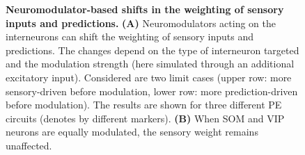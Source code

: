 \documentclass[10pt,a4paper,draft]{article}
\begin{document}
\begin{figure}[t!]
	\centering
\caption{\footnotesize{\bf Neuromodulator-based shifts in the weighting of sensory inputs and predictions.
\newline} 
{\bf (A)} Neuromodulators acting on the interneurons can shift the weighting of sensory inputs and predictions. The changes depend on the type of interneuron targeted and the modulation strength (here simulated through an additional excitatory input). Considered are two limit cases (upper row: more sensory-driven before modulation, lower row: more prediction-driven before modulation). The results are shown for three different PE circuits (denotes by different markers).
{\bf (B)} When SOM and VIP neurons are equally modulated, the sensory weight remains unaffected. 
}
\end{figure}
\end{document}
